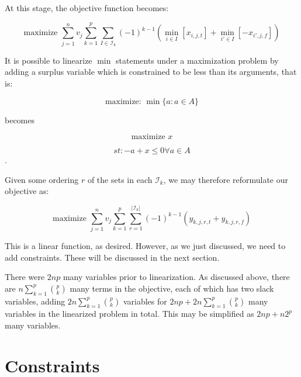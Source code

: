 \documentclass[a4paper]{article}
\begin{document}
At this stage, the objective function becomes:

$$\textrm{maximize }\sum_{j=1}^n v_j \sum_{k=1}^{p} \sum_{I \in \mathcal{I}_k} 
(-1)^{k-1}(\min_{i \in I} [x_{i,j,t}] + \min_{i' \in I} [-x_{i',j,f}])$$

It is possible to linearize $\min$ statements under a maximization problem by adding a surplus variable which is constrained to be less than its arguments, that is:

$$\textrm{maximize: } \min\{a : a \in A\}$$

becomes

$$\textrm{maximize } x$$

$$st: - a + x \leq 0 \forall a \in A$$.

Given some ordering $r$ of the sets in each $\mathcal{I}_k$, we may therefore reformulate our objective as:


$$\textrm{maximize }\sum_{j=1}^n v_j \sum_{k=1}^{p} \sum_{r=1}^{|\mathcal{I}_k|}
(-1)^{k-1} (y_{k,j,r,t} + y_{k,j,r,f})$$

This is a linear function, as desired. However, as we just discussed, we need to add constraints. These will be discussed in the next section.

There were $2np$ many variables prior to linearization. As discussed above, there are $n\sum_{k=1}^p {p \choose k}$ many terms in the objective, each of which has two slack variables, adding $2n \sum_{k=1}^p {p \choose k}$ variables for $2np + 2n\sum_{k=1}^p {p \choose k}$ many variables in the linearized problem in total. This may be simplified as $2np + n2^p$ many variables.

\section{Constraints}
\end{document}
